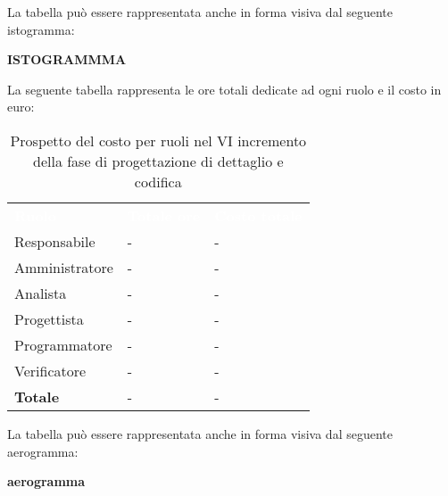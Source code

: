 La tabella può essere rappresentata anche in forma visiva dal seguente istogramma:

\textbf{ISTOGRAMMMA}


La seguente tabella rappresenta le ore totali dedicate ad ogni ruolo e il costo in euro:

\begin{table}[!htbp]
\begin{center}
\renewcommand{\arraystretch}{1.5}
\begin{tabular}{ m{}<{\centering}  m{}<{\centering} m{}<{\centering}}
	\rowcolor{darkblue}
	\textcolor{white}{\textbf{Ruolo}}&\textcolor{white}{\textbf{Totale ore}}&\textcolor{white}{\textbf{Costo totale}}\\ 

	Responsabile  & - & - \\	

	Amministratore & - & - \\
	
	Analista & - & - \\
	
	Progettista & - & - \\
	
	Programmatore & - & - \\
	
	Verificatore & - & - \\
	
	\textbf{Totale} & - & - \\
	
\end{tabular}
\caption{Prospetto del costo per ruoli nel VI incremento della fase di progettazione di dettaglio e codifica}
\end{center}
\end{table}

La tabella può essere rappresentata anche in forma visiva dal seguente aerogramma:

\textbf{aerogramma}


